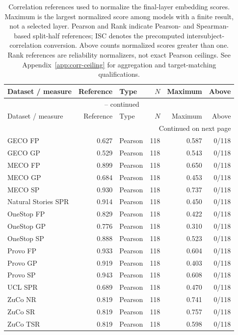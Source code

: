 {\small\setlength{\tabcolsep}{4pt}
\begin{longtable}{@{}lrlrrr@{}}
\caption{Correlation references used to normalize the final-layer embedding scores. Maximum is the largest normalized score among models with a finite result, not a selected layer. Pearson and Rank indicate Pearson- and Spearman-based split-half references; ISC denotes the precomputed intersubject-correlation conversion. Above counts normalized scores greater than one. Rank references are reliability normalizers, not exact Pearson ceilings. See Appendix~\ref{app:corr-ceiling} for aggregation and target-matching qualifications.}\label{tab:corr-ceilings} \\
\toprule
Dataset / measure & Reference & Type & $N$ & Maximum & Above \\
\midrule
\endfirsthead
\multicolumn{6}{c}{\tablename\ \thetable{} -- continued} \\
\toprule
Dataset / measure & Reference & Type & $N$ & Maximum & Above \\
\midrule
\endhead
\midrule\multicolumn{6}{r}{Continued on next page} \\
\endfoot
\bottomrule
\endlastfoot
GECO FP & 0.627 & Pearson & 118 & 0.587 & 0/118 \\
GECO GP & 0.529 & Pearson & 118 & 0.543 & 0/118 \\
MECO FP & 0.899 & Pearson & 118 & 0.650 & 0/118 \\
MECO GP & 0.684 & Pearson & 118 & 0.453 & 0/118 \\
MECO SP & 0.930 & Pearson & 118 & 0.737 & 0/118 \\
Natural Stories SPR & 0.914 & Pearson & 118 & 0.450 & 0/118 \\
OneStop FP & 0.829 & Pearson & 118 & 0.422 & 0/118 \\
OneStop GP & 0.776 & Pearson & 118 & 0.310 & 0/118 \\
OneStop SP & 0.888 & Pearson & 118 & 0.523 & 0/118 \\
Provo FP & 0.933 & Pearson & 118 & 0.604 & 0/118 \\
Provo GP & 0.919 & Pearson & 118 & 0.403 & 0/118 \\
Provo SP & 0.943 & Pearson & 118 & 0.608 & 0/118 \\
UCL SPR & 0.689 & Pearson & 118 & 0.470 & 0/118 \\
ZuCo NR & 0.819 & Pearson & 118 & 0.741 & 0/118 \\
ZuCo SR & 0.819 & Pearson & 118 & 0.757 & 0/118 \\
ZuCo TSR & 0.819 & Pearson & 118 & 0.598 & 0/118 \\

\end{longtable}}
